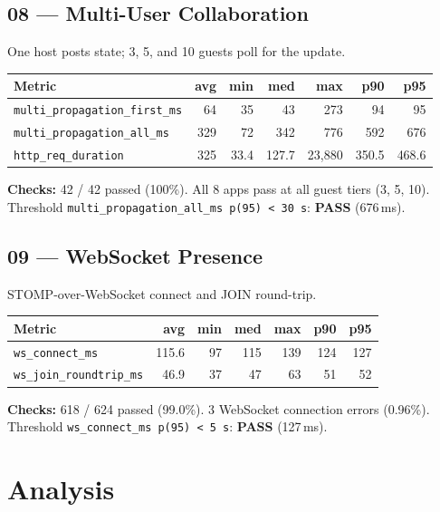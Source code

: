 \documentclass[11pt,a4paper]{article}
\newcommand{\pass}{\textcolor{pass}{\textbf{PASS}}}
\begin{document}
\subsection{08 — Multi-User Collaboration}

One host posts state; 3, 5, and 10 guests poll for the update.

\begin{tabular}{@{}lrrrrrr@{}}
\toprule
\textbf{Metric} & \textbf{avg} & \textbf{min} & \textbf{med} & \textbf{max} & \textbf{p90} & \textbf{p95} \\
\midrule
\texttt{multi\_propagation\_first\_ms} & 64    & 35   & 43    & 273    & 94     & 95     \\
\texttt{multi\_propagation\_all\_ms}   & 329   & 72   & 342   & 776    & 592    & 676    \\
\texttt{http\_req\_duration}           & 325   & 33.4 & 127.7 & 23,880 & 350.5  & 468.6  \\
\bottomrule
\end{tabular}

\medskip
\noindent\textbf{Checks:} 42 / 42 passed (100\%).
All 8 apps pass at all guest tiers (3, 5, 10).
Threshold \texttt{multi\_propagation\_all\_ms p(95) < 30\,s}: \pass{} (676\,ms).

\subsection{09 — WebSocket Presence}

STOMP-over-WebSocket connect and JOIN round-trip.

\begin{tabular}{@{}lrrrrrr@{}}
\toprule
\textbf{Metric} & \textbf{avg} & \textbf{min} & \textbf{med} & \textbf{max} & \textbf{p90} & \textbf{p95} \\
\midrule
\texttt{ws\_connect\_ms}        & 115.6 & 97  & 115 & 139 & 124 & 127 \\
\texttt{ws\_join\_roundtrip\_ms} & 46.9  & 37  & 47  & 63  & 51  & 52  \\
\bottomrule
\end{tabular}

\medskip
\noindent\textbf{Checks:} 618 / 624 passed (99.0\%).
3 WebSocket connection errors (0.96\%).
Threshold \texttt{ws\_connect\_ms p(95) < 5\,s}: \pass{} (127\,ms).

\section{Analysis}
\end{document}
